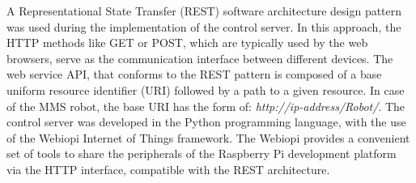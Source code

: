 A Representational State Transfer (REST) \cite{wikipedia} software architecture design pattern was used during the implementation of the control server. In this approach, the HTTP methods like GET or POST, which are typically used by the web browsers, serve as the communication interface between different devices. The web service API, that conforms to the REST pattern is composed of a base uniform resource identifier (URI) followed by a path to a given resource. In case of the MMS robot, the base URI has the form of: \textit{http://ip-address/Robot/}. The control server was developed in the Python programming language, with the use of the Webiopi \cite{webiopi} Internet of Things framework. The Webiopi provides a convenient set of tools to share the peripherals of the Raspberry Pi development platform via the HTTP interface, compatible with the REST architecture.

%
%
%
%
%
